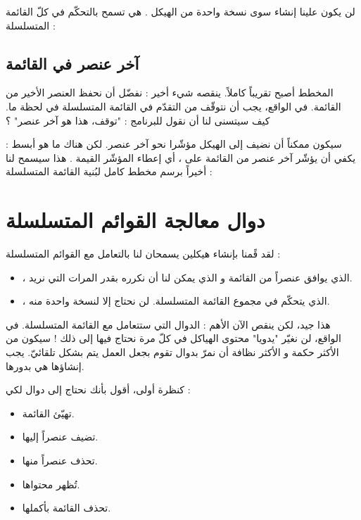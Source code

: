 لن يكون علينا إنشاء سوى نسخة واحدة من الهيكل
.
هي تسمح بالتحكّم في كلّ القائمة المتسلسلة :
 

\subsection{آخر عنصر في القائمة}

المخطط أصبح تقريباً كاملاً. ينقصه شيء أخير : نفضّل أن نحفظ العنصر الأخير من القائمة. في الواقع، يجب أن نتوقّف من التقدّم في القائمة المتسلسلة في لحظة ما. كيف سيتسنى لنا أن نقول للبرنامج : "توقف، هذا هو آخر عنصر" ؟

سيكون ممكناً أن نضيف إلى الهيكل 
مؤشّرا نحو آخر عنصر. لكن هناك ما هو أبسط : يكفي أن يؤشّر آخر عنصر من القائمة على
،
أي إعطاء المؤشّر
القيمة
.
هذا سيسمح لنا أخيراً برسم مخطط كامل لبُنية القائمة المتسلسلة :


\section{دوال معالجة القوائم المتسلسلة}

لقد قًمنا بإنشاء هيكلين يسمحان لنا بالتعامل مع القوائم المتسلسلة :

\begin{itemize}
	\item {}،
	الذي يوافق عنصراً من القائمة و الذي يمكن لنا أن نكرره بقدر المرات التي نريد.
	\item {}،
	الذي يتحكّم في مجموع القائمة المتسلسلة. لن نحتاج إلا لنسخة واحدة منه.
\end{itemize}

هذا جيد، لكن ينقص الآن الأهم : الدوال التي ستتعامل مع القائمة المتسلسلة. في الواقع، لن نغيّر "يدويا" محتوى الهياكل في كلّ مرة نحتاج فيها إلى ذلك ! سيكون من الأكثر حكمة و الأكثر نظافة أن نمرّ بدوال تقوم بجعل العمل يتم بشكل تلقائيّ. يجب إنشاؤها هي بدورها.

كنظرة أولى، أقول بأنك نحتاج إلى دوال لكي :

\begin{itemize}
	\item تهيّئ القائمة.
	\item تضيف عنصراً إليها.
	\item تحذف عنصراً منها.
	\item تُظهر محتواها.
	\item تحذف القائمة بأكملها.
\end{itemize}

